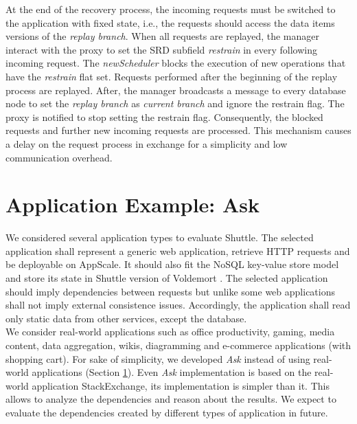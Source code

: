 At the end of the recovery process, the incoming requests must be switched to the application with fixed state, i.e., the requests should access the data items versions of the \emph{replay branch}. When all requests are replayed, the manager interact with the proxy to set the \ac{SRD} subfield \emph{restrain} in every following incoming request. The \emph{newScheduler} blocks the execution of new operations that have the \emph{restrain} flat set. Requests performed after the beginning of the replay process are replayed. After, the manager broadcasts a message to every database node to set the \emph{replay branch} as \emph{current branch} and ignore the restrain flag. The proxy is notified to stop setting the restrain flag. Consequently, the blocked requests and further new incoming requests are processed. This mechanism causes a delay on the request process in exchange for a simplicity and low communication overhead. 

\section{Application Example: Ask}\label{sec:impl:application}

We considered several application types to evaluate Shuttle. The selected application shall represent a generic web application, retrieve \ac{HTTP} requests and be deployable on AppScale. It should also fit the \acs{NoSQL} key-value store model and store its state in Shuttle version of Voldemort \cite{Kreps}. The selected application should imply dependencies between requests but unlike some web applications shall not imply external consistence issues. Accordingly, the application shall read only static data from other services, except the database.\\

We consider real-world applications such as office productivity, gaming, media content, data aggregation, wikis, diagramming and e-commerce applications (with shopping cart). For sake of simplicity, we developed \textit{Ask} instead of using real-world applications (Section \ref{sec:impl:application}). Even \textit{Ask} implementation is based on the real-world application StackExchange, its implementation is simpler than it. This allows to analyze the dependencies and reason about the results. We expect to evaluate the dependencies created by different types of application in future.

